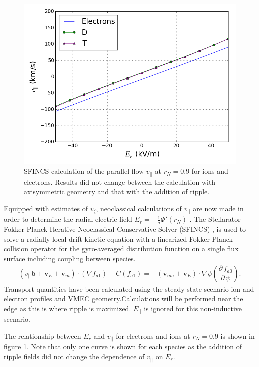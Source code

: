 \documentclass{article}
\newcommand{\partder}[2]{\dfrac{\partial \, #1}{\partial \, #2}} %
\begin{document}
\begin{figure}[h!]
\centering
\includegraphics[width=1\textwidth]{Er_flow.png}
\caption{\label{fig:Er_flow} SFINCS calculation of the parallel flow $v_{||}$ at $r_N = 0.9$ for ions and electrons. Results did not change between the calculation with axisymmetric geometry and that with the addition of ripple.}
\end{figure}

Equipped with estimates of $v_{\zeta}$, neoclassical calculations of $v_{||}$ are now made in order to determine the radial electric field $E_r = - \frac{1}{a} \Phi'(r_N)$ . The Stellarator Fokker-Planck Iterative Neoclassical Conservative Solver (SFINCS) \cite{Landreman2014}, is used to solve a radially-local drift kinetic equation with a linearized Fokker-Planck collision operator for the gyro-averaged distribution function on a single flux surface including coupling between species. 
\begin{gather}
( v_{||} \bm{b} + \bm{v}_E + \bm{v}_m) \cdot (\nabla f_{a1})  - C(f_{a1}) = - (\bm{v}_{ma} + \bm{v}_E) \cdot \nabla \psi \left( \partder{f_{a0}}{\psi} \right).
\end{gather} \label{kineticequation}
Transport quantities have been calculated using the steady state scenario ion and electron profiles and VMEC geometry.Calculations will be performed near the edge as this is where ripple is maximized. $E_{||}$ is ignored for this non-inductive scenario.

The relationship between $E_r$ and $v_{||}$ for electrons and ions at $r_N = 0.9$ is shown in figure \ref{fig:Er_flow}. Note that only one curve is shown for each species as the addition of ripple fields did not change the dependence of $v_{||}$ on $E_r$.  
\end{document}
